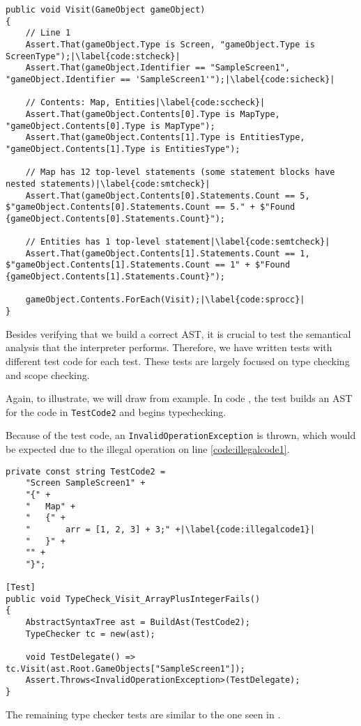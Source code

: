 \begin{lstlisting}[caption={GameObject visitor code for testing the AST Builder}, label={lst:gameobjecttest},escapechar=|, language=CSharp]
public void Visit(GameObject gameObject)
{
    // Line 1
    Assert.That(gameObject.Type is Screen, "gameObject.Type is ScreenType");|\label{code:stcheck}|
    Assert.That(gameObject.Identifier == "SampleScreen1", "gameObject.Identifier == 'SampleScreen1'");|\label{code:sicheck}|
    
    // Contents: Map, Entities|\label{code:sccheck}|
    Assert.That(gameObject.Contents[0].Type is MapType, "gameObject.Contents[0].Type is MapType");
    Assert.That(gameObject.Contents[1].Type is EntitiesType, "gameObject.Contents[1].Type is EntitiesType");

    // Map has 12 top-level statements (some statement blocks have nested statements)|\label{code:smtcheck}|
    Assert.That(gameObject.Contents[0].Statements.Count == 5, $"gameObject.Contents[0].Statements.Count == 5." + $"Found {gameObject.Contents[0].Statements.Count}");
    
    // Entities has 1 top-level statement|\label{code:semtcheck}|
    Assert.That(gameObject.Contents[1].Statements.Count == 1, $"gameObject.Contents[1].Statements.Count == 1" + $"Found {gameObject.Contents[1].Statements.Count}");
    
    gameObject.Contents.ForEach(Visit);|\label{code:sprocc}|
}
\end{lstlisting}

Besides verifying that we build a correct AST, it is crucial to test the semantical analysis that the \dazel{} interpreter performs. Therefore, we have written tests with different \dazel{} test code for each test. These tests are largely focused on type checking and scope checking.

Again, to illustrate, we will draw from example. In code , the test builds an AST for the code in \texttt{TestCode2} and begins typechecking.

Because of the test code, an \texttt{InvalidOperationException} is thrown, which would be expected due to the illegal operation on line \ref{code:illegalcode1}.

\begin{lstlisting}[caption={Testing that arrays and integers cannot be added together}, label={lst:ArrayPlusIntegerFails}, language=CSharp, escapechar=|]
private const string TestCode2 =
    "Screen SampleScreen1" +
    "{" +
    "   Map" +
    "   {" +
    "       arr = [1, 2, 3] + 3;" +|\label{code:illegalcode1}|
    "   }" +
    "" +
    "}";

[Test]
public void TypeCheck_Visit_ArrayPlusIntegerFails()
{
    AbstractSyntaxTree ast = BuildAst(TestCode2);
    TypeChecker tc = new(ast);

    void TestDelegate() => tc.Visit(ast.Root.GameObjects["SampleScreen1"]);
    Assert.Throws<InvalidOperationException>(TestDelegate);
}
\end{lstlisting}

The remaining type checker tests are similar to the one seen in .
